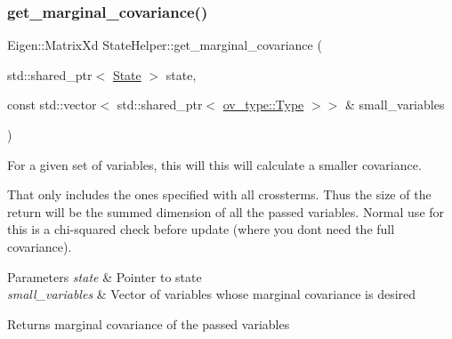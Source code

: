 \subsubsection{\texorpdfstring{get\+\_\+marginal\+\_\+covariance()}{get\_marginal\_covariance()}}
{\footnotesize\ttfamily Eigen\+::\+Matrix\+Xd State\+Helper\+::get\+\_\+marginal\+\_\+covariance (\begin{DoxyParamCaption}\item[{std\+::shared\+\_\+ptr$<$ \hyperlink{classov__msckf_1_1State}{State} $>$}]{state,  }\item[{const std\+::vector$<$ std\+::shared\+\_\+ptr$<$ \hyperlink{classov__type_1_1Type}{ov\+\_\+type\+::\+Type} $>$$>$ \&}]{small\+\_\+variables }\end{DoxyParamCaption})\hspace{0.3cm}{\ttfamily [static]}}



For a given set of variables, this will this will calculate a smaller covariance. 

That only includes the ones specified with all crossterms. Thus the size of the return will be the summed dimension of all the passed variables. Normal use for this is a chi-\/squared check before update (where you don\textquotesingle{}t need the full covariance).


\begin{DoxyParams}{Parameters}
{\em state} & Pointer to state \\
\hline
{\em small\+\_\+variables} & Vector of variables whose marginal covariance is desired \\
\hline
\end{DoxyParams}
\begin{DoxyReturn}{Returns}
marginal covariance of the passed variables 
\end{DoxyReturn}
\mbox{\label{classov__msckf_1_1StateHelper_a58ed364529ae3802a7110edf3ac4dbbb}} 
